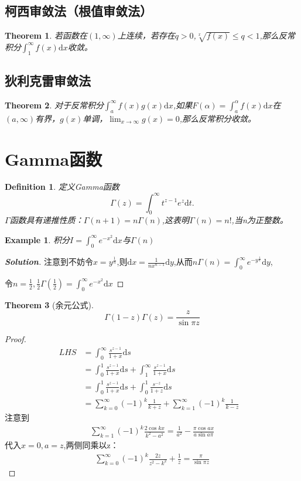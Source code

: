\documentclass[12pt,a4paper,UTF8]{ctexbook}
\theoremstyle{plain}
\newtheorem{theorem}{\indent Theorem}[section]
\newtheorem{definition}{\indent Definition}[section]
\newtheorem{example}{\indent Example}[section]
\newenvironment{solution}{\begin{proof}[\indent\bf Solution]}{\end{proof}}
\begin{document}
\subsection{柯西审敛法（根值审敛法）}
\begin{theorem}
若函数在$(1,\infty)$上连续，若存在$q>0$,$\sqrt[x]{f(x)}\leq q<1$,那么反常积分$\int_{1}^{\infty}f(x)\mathrm{d}x$收敛。
\end{theorem}
\subsection{狄利克雷审敛法}
\begin{theorem}
对于反常积分$\int_a^\infty f(x)g(x)\mathrm{d}x$,如果$F(\alpha)=\int_{a}^\alpha f(x)\mathrm{d}x$在$(a,\infty)$有界，$g(x)$单调，$\lim_{x\to\infty}g(x)=0$,那么反常积分收敛。
\end{theorem}
\section{Gamma函数}
\begin{definition}
定义Gamma函数
\begin{equation}
\Gamma (z)=\int_{0}^\infty t^{z-1}e^{z}\mathrm d t. 
\end{equation}
$\Gamma$函数具有递推性质：$\Gamma(n+1)=n\Gamma(n)$,这表明$\Gamma(n)=n!$,当n为正整数。
\end{definition}
\begin{example}积分$I=\int_{0}^{\infty}e^{-x^2}\mathrm d x$与$\Gamma(n)$\end{example}
\begin{solution}注意到不妨令$x=y^{\frac{1}{n}}$,则$\mathrm d x=\frac{1}{nx^{n-1}}\mathrm dy$,从而$n\Gamma(n)=\int_{0}^\infty e^{-y^\frac{1}{n}}\mathrm d y$,

令$n=\frac{1}{2},\frac{1}{2}\Gamma (\frac{1}{2})=\int_{0}^\infty e^{-x^2}\mathrm{d}x$
\end{solution}
\begin{theorem}[余元公式]
\begin{equation}
\Gamma(1-z)\Gamma(z)=\frac{z}{\sin \pi z}
\end{equation}
\end{theorem}
\begin{proof}
    \begin{align*}
    LHS&=\int_0^\infty\frac{s^{z-1}}{1+x}\mathrm ds&\\&=\int_0^1\frac{s^{z-1}}{1+x}\mathrm ds+\int_1^\infty \frac{s^{z-1}}{1+x}\mathrm ds&\\
    &=\int_0^1\frac{s^{z-1}}{1+x}\mathrm ds+\int_0^1 \frac{s^{-z}}{1+z}\mathrm ds&\\&=\sum_{k=0}^{\infty}(-1)^k\frac{1}{k+z}+\sum_{k=1}^{\infty}(-1)^k\frac{1}{k-z}&
    \end{align*}
注意到\begin{align*}\sum_{k=1}^\infty(-1)^k\frac{2\cos kx}{k^2-a^2}=\frac{1}{a^2}-\frac{\pi\cos ax}{a\sin a\pi}\end{align*}代入$x=0,a=z$,两侧同乘以z：
\begin{align*}\sum_{k=0}^{\infty}(-1)^k\frac{2z}{z^2-k^2}+\frac{1}{z}=\frac{\pi}{\sin\pi z}\end{align*}
\end{proof}
\end{document}

